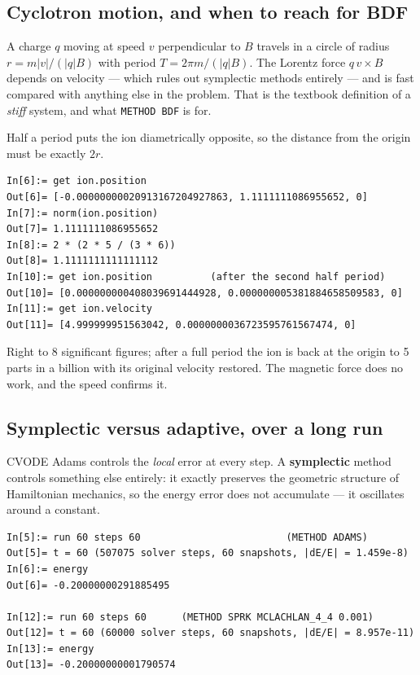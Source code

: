 \documentclass[11pt]{article}
\newcommand{\kw}[1]{\texttt{\uppercase{#1}}}
\begin{document}
\subsection{Cyclotron motion, and when to reach for BDF}

A charge $q$ moving at speed $v$ perpendicular to $B$ travels in a
circle of radius $r = m|v|/(|q|B)$ with period $T = 2\pi m/(|q|B)$. The
Lorentz force $q\,v\times B$ depends on velocity --- which rules out
symplectic methods entirely --- and is fast compared with anything else
in the problem. That is the textbook definition of a \emph{stiff}
system, and what \kw{method bdf} is for.

Half a period puts the ion diametrically opposite, so the distance from
the origin must be exactly $2r$.

\begin{lstlisting}
In[6]:= get ion.position
Out[6]= [-0.00000000020913167204927863, 1.1111111086955652, 0]
In[7]:= norm(ion.position)
Out[7]= 1.1111111086955652
In[8]:= 2 * (2 * 5 / (3 * 6))
Out[8]= 1.1111111111111112
In[10]:= get ion.position          (after the second half period)
Out[10]= [0.000000000408039691444928, 0.000000005381884658509583, 0]
In[11]:= get ion.velocity
Out[11]= [4.999999951563042, 0.0000000036723595761567474, 0]
\end{lstlisting}

Right to 8 significant figures; after a full period the ion is back at
the origin to 5 parts in a billion with its original velocity restored.
The magnetic force does no work, and the speed confirms it.

\subsection{Symplectic versus adaptive, over a long run}

CVODE Adams controls the \emph{local} error at every step. A
\textbf{symplectic} method controls something else entirely: it exactly
preserves the geometric structure of Hamiltonian mechanics, so the
energy error does not accumulate --- it oscillates around a constant.

\begin{lstlisting}
In[5]:= run 60 steps 60                         (METHOD ADAMS)
Out[5]= t = 60 (507075 solver steps, 60 snapshots, |dE/E| = 1.459e-8)
In[6]:= energy
Out[6]= -0.20000000291885495

In[12]:= run 60 steps 60      (METHOD SPRK MCLACHLAN_4_4 0.001)
Out[12]= t = 60 (60000 solver steps, 60 snapshots, |dE/E| = 8.957e-11)
In[13]:= energy
Out[13]= -0.20000000001790574
\end{lstlisting}
\end{document}
